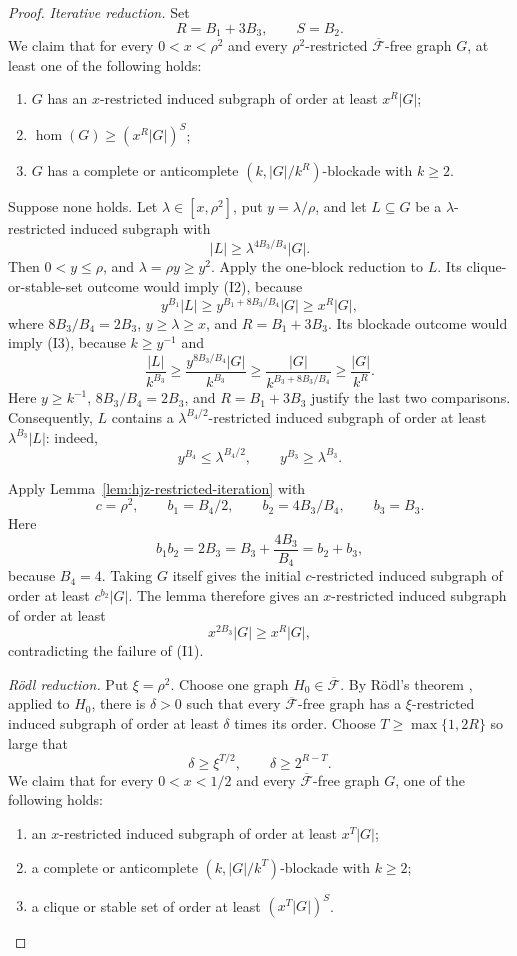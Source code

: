 \documentclass[11pt]{article}
\numberwithin{equation}{section}
\theoremstyle{plain}
\theoremstyle{definition}
\begin{document}
\begin{proof}
\medskip
\noindent\emph{Iterative reduction.}
Set
\[
                     R=B_1+3B_3,\qquad S=B_2.
\]
We claim that for every $0<x<\rho^2$ and every
$\rho^2$-restricted $\overline{\mathcal F}$-free graph $G$, at least
one of the following holds:
\begin{enumerate}[label=(I\arabic*)]
\item $G$ has an $x$-restricted induced subgraph of order at least
      $x^R|G|$;
\item $\operatorname{hom}(G)\geq(x^R|G|)^S$;
\item $G$ has a complete or anticomplete
      $(k,|G|/k^R)$-blockade with $k\geq2$.
\end{enumerate}

Suppose none holds.  Let $\lambda\in[x,\rho^2]$, put
$y=\lambda/\rho$, and let $L\subseteq G$ be a
$\lambda$-restricted induced subgraph with
\[
                 |L|\geq
          \lambda^{4B_3/B_4}|G|.
\]
Then $0<y\leq\rho$, and $\lambda=\rho y\geq y^2$.  Apply the
  one-block reduction to $L$.  Its clique-or-stable-set outcome would imply
(I2), because
\[
 y^{B_1}|L|
  \geq y^{B_1+8B_3/B_4}|G|
  \geq x^R|G|,
\]
where $8B_3/B_4=2B_3$, $y\geq\lambda\geq x$, and
$R=B_1+3B_3$.  Its blockade outcome would imply (I3),
because $k\geq y^{-1}$ and
\[
 \frac{|L|}{k^{B_3}}
 \geq\frac{y^{8B_3/B_4}|G|}{k^{B_3}}
 \geq\frac{|G|}{k^{B_3+8B_3/B_4}}
\geq\frac{|G|}{k^R}.
\]
Here $y\geq k^{-1}$, $8B_3/B_4=2B_3$, and
$R=B_1+3B_3$ justify the last two comparisons.
Consequently, $L$ contains a
$\lambda^{B_4/2}$-restricted induced subgraph of order at least
$\lambda^{B_3}|L|$: indeed,
\[
                  y^{B_4}\leq\lambda^{B_4/2},
            \qquad y^{B_3}\geq\lambda^{B_3}.
\]

Apply Lemma~\ref{lem:hjz-restricted-iteration} with
\[
 c=\rho^2,\qquad
 b_1=B_4/2,\qquad b_2=4B_3/B_4,\qquad b_3=B_3.
\]
Here
\[
 b_1b_2=2B_3
      =B_3+\frac{4B_3}{B_4}=b_2+b_3,
\]
because $B_4=4$.  Taking $G$ itself gives the initial
$c$-restricted induced subgraph of order at least $c^{b_2}|G|$.
The lemma therefore gives an $x$-restricted induced subgraph of order
at least
\[
                 x^{2B_3}|G|\geq x^R|G|,
\]
contradicting the failure of (I1).

\medskip
\noindent\emph{R\"odl reduction.}
Put $\xi=\rho^2$.  Choose one graph
$H_0\in\overline{\mathcal F}$.  By R\"odl's theorem
\cite{Rodl1986}, applied to $H_0$, there is $\delta>0$ such that every
$\overline{\mathcal F}$-free graph has a $\xi$-restricted induced
subgraph of order at least $\delta$ times its order.  Choose
$T\geq\max\{1,2R\}$ so large that
\[
                  \delta\geq\xi^{T/2},
              \qquad \delta\geq2^{R-T}.
\]
We claim that for every $0<x<1/2$ and every
$\overline{\mathcal F}$-free graph $G$, one of the following holds:
\begin{enumerate}[label=(R\arabic*)]
\item an $x$-restricted induced subgraph of order at least $x^T|G|$;
\item a complete or anticomplete
      $(k,|G|/k^T)$-blockade with $k\geq2$;
\item a clique or stable set of order at least $(x^T|G|)^S$.
\end{enumerate}


\end{proof}
\end{document}
